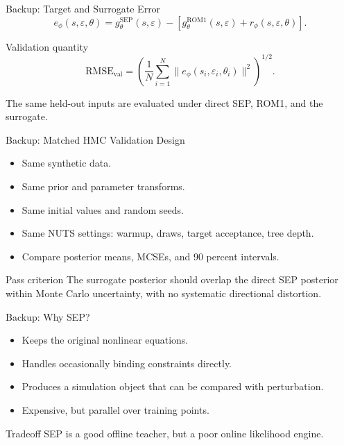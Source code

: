 \documentclass[aspectratio=169,10pt]{beamer}
\newcommand{\sep}{\mathrm{SEP}}
\newcommand{\rom}{\mathrm{ROM1}}
\newcommand{\eps}{\varepsilon}
\newcommand{\state}{s}
\begin{document}
\begin{frame}{Backup: Target and Surrogate Error}
\[
  e_{\phi}(\state,\eps,\theta)
  =
  g^{\sep}_{\theta}(\state,\eps)
  -
  \left[
    g^{\rom}_{\theta}(\state,\eps)
    +
    r_{\phi}(\state,\eps,\theta)
  \right].
\]

\vspace{0.5em}
\begin{block}{Validation quantity}
\[
  \mathrm{RMSE}_{\mathrm{val}}
  =
  \left(
  \frac{1}{N}\sum_{i=1}^{N}
  \| e_{\phi}(\state_i,\eps_i,\theta_i) \|^2
  \right)^{1/2}.
\]
\end{block}

\begin{center}
\small The same held-out inputs are evaluated under direct SEP, ROM1, and the surrogate.
\end{center}
\end{frame}

\begin{frame}{Backup: Matched HMC Validation Design}
\begin{itemize}
  \item Same synthetic data.
  \item Same prior and parameter transforms.
  \item Same initial values and random seeds.
  \item Same NUTS settings: warmup, draws, target acceptance, tree depth.
  \item Compare posterior means, MCSEs, and 90 percent intervals.
\end{itemize}

\vspace{0.5em}
\begin{block}{Pass criterion}
The surrogate posterior should overlap the direct SEP posterior within Monte
Carlo uncertainty, with no systematic directional distortion.
\end{block}
\end{frame}

\begin{frame}{Backup: Why SEP?}
\begin{itemize}
  \item Keeps the original nonlinear equations.
  \item Handles occasionally binding constraints directly.
  \item Produces a simulation object that can be compared with perturbation.
  \item Expensive, but parallel over training points.
\end{itemize}

\vspace{0.5em}
\begin{block}{Tradeoff}
SEP is a good offline teacher, but a poor online likelihood engine.
\end{block}
\end{frame}
\end{document}
